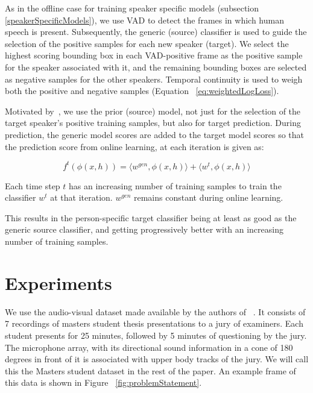 \documentclass[runningheads]{llncs}
\begin{document}
As in the offline case for training speaker specific models (subsection \ref{speakerSpecificModels}), we use VAD to detect the frames in which human speech is present. Subsequently, the generic (source) classifier is used to guide the selection of the positive samples for each new speaker (target). We select the highest scoring bounding box in each VAD-positive frame as the positive sample for the speaker associated with it, and the remaining bounding boxes are selected as negative samples for the other speakers. Temporal continuity is used to weigh both the positive and negative samples (Equation ~\ref{eq:weightedLogLoss}).

Motivated by~\cite{Gavves15}, we use the prior (source) model, not just for the selection of the target speaker's positive training samples, but also for target prediction.
During prediction, the generic model scores are added to the target model scores 
so that the prediction score from online learning, at each iteration is given as:

\begin{dmath}
f^{t}(\phi(x,h))=\langle w^{gen}, \phi(x,h) \rangle + \langle w^{t}, \phi(x,h) \rangle
\label{eq:predictionScore}
\end{dmath}

Each time step $t$ has an increasing number of training samples to train the classifier $w^{t}$ at that iteration. $ w^{gen}$ remains constant during online learning.

This results in the person-specific target classifier being at least as good as the generic source classifier, and getting progressively better with an increasing number of training samples.






\section{Experiments}
\label{expts}

We use the audio-visual dataset made available by the authors of ~\cite{Chakravarty15}. It consists of 7 recordings of masters student thesis presentations to a jury of examiners. Each student presents for 25 minutes, followed by 5 minutes of questioning by the jury. The microphone array, with its directional sound information in a cone of 180 degrees in front of it is associated with upper body tracks of the jury. We will call this the Masters student dataset in the rest of the paper. An example frame of this data is shown in Figure ~\ref{fig:problemStatement}.
\end{document}

